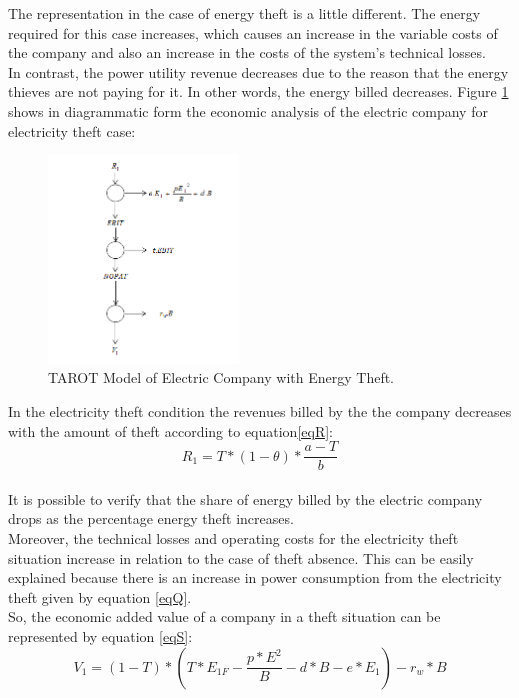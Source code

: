\documentclass[preprint,12pt]{elsarticle}
\begin{document}
The representation in the case of energy theft is a little different. The energy required for this case increases, which causes an increase in the variable costs of the company and also an increase in the costs of the system's technical losses. \\
In contrast, the power utility revenue decreases due to the reason that the energy thieves are not paying for it. In other words, the energy billed decreases. 
Figure \ref{Fig5} shows in diagrammatic form the economic analysis of the electric company for electricity theft case:

\begin{figure}[h]%
\centering
\includegraphics[width = 0.45\textwidth]{Fig5.png} 
\caption{TAROT Model of Electric Company with Energy Theft.}
\label{Fig5}
\end{figure}
In the electricity theft condition the revenues billed by the the company decreases with the amount of theft according to equation\ref{eqR}:\\
\begin{equation}
R_1 = T*(1-\theta)* \frac{a-T}{b}
\label{eqR}
\end{equation}\\
It is possible to verify that the share of energy billed by the electric company drops as the percentage energy theft  increases.\\
Moreover, the technical losses and operating costs for the electricity theft situation increase in relation to the case of theft absence. This can be easily explained because there is an increase in power consumption from the electricity theft given by equation \ref{eqQ}. \\
So, the economic added value of a company in a theft situation can be represented by equation \ref{eqS}:
\begin{equation}
V_1 = (1-T)*\left( T*E_{1F} - \frac{p*E^2}{B} - d*B -e*E_1\right) - r_w * B
\label{eqS}
\end{equation}\\
\end{document}
